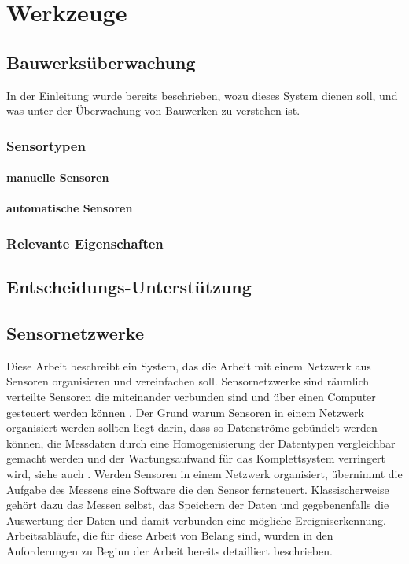 \chapter{Werkzeuge}

\section{Bauwerksüberwachung}
In der Einleitung wurde bereits beschrieben, wozu dieses System dienen soll, und was unter der Überwachung von Bauwerken zu verstehen ist. 

\subsection{Sensortypen}
\subsubsection{manuelle Sensoren}
\subsubsection{automatische Sensoren}
\subsection{Relevante Eigenschaften}

\section{Entscheidungs-Unterstützung}

\section{Sensornetzwerke}
Diese Arbeit beschreibt ein System, das die Arbeit mit einem Netzwerk aus Sensoren organisieren und vereinfachen soll. Sensornetzwerke sind räumlich verteilte Sensoren die miteinander verbunden sind und über einen Computer gesteuert werden können \citep{botts_ogc_2008}. Der Grund warum Sensoren in einem Netzwerk organisiert werden sollten liegt darin, dass so Datenströme gebündelt werden können, die Messdaten durch eine Homogenisierung der Datentypen vergleichbar gemacht werden und der Wartungsaufwand für das Komplettsystem verringert wird, siehe auch \citep{resch_standardisierte_2012} \citep{bermudez_ogc_2011}. Werden Sensoren in einem Netzwerk organisiert, übernimmt die Aufgabe des Messens eine Software die den Sensor fernsteuert. Klassischerweise gehört dazu das Messen selbst, das Speichern der Daten und gegebenenfalls die Auswertung der Daten und damit verbunden eine mögliche Ereigniserkennung. Arbeitsabläufe, die für diese Arbeit von Belang sind, wurden in den Anforderungen zu Beginn der Arbeit bereits detailliert beschrieben. 


